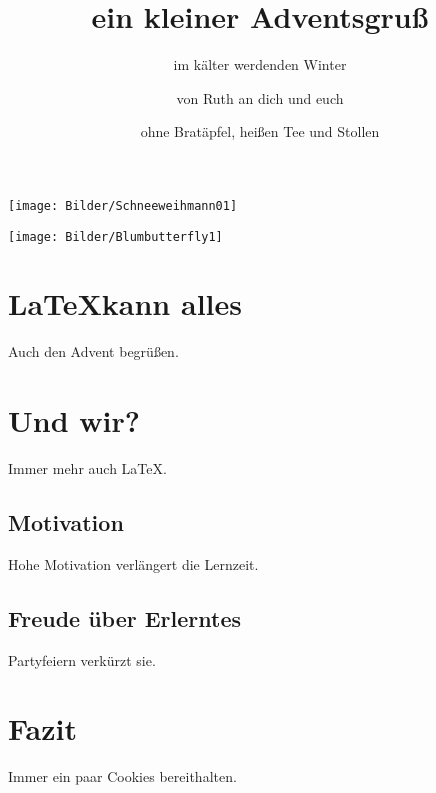\documentclass{scrartcl}%
\begin{document}
\titlehead{}%
\subject{Als Testfile}%
\title{ein kleiner Adventsgruß}%
\subtitle{im kälter werdenden Winter}%
\author{von Ruth an dich und euch}%
\date{ohne Bratäpfel, heißen Tee und Stollen}%
\publishers{sondern mit \LaTeX}%
\maketitle%
\tableofcontents

\listoffigures

\begin{center}
\texttt{[image: Bilder/Schneeweihmann01]}\label{fig:Schneeweihmann01}
\end{center}

\begin{center}
\texttt{[image: Bilder/Blumbutterfly1]}\label{fig:Blumbutterfly1}
\end{center}
\section{\LaTeX kann alles}
Auch den Advent begrüßen. 
\section{Und wir?}
Immer mehr auch \LaTeX. 
\subsection{Motivation}
Hohe Motivation verlängert die Lernzeit.
\subsection{Freude über Erlerntes}
Partyfeiern verkürzt sie. 
\section{Fazit}
Immer ein paar Cookies bereithalten.  
\end{document}
